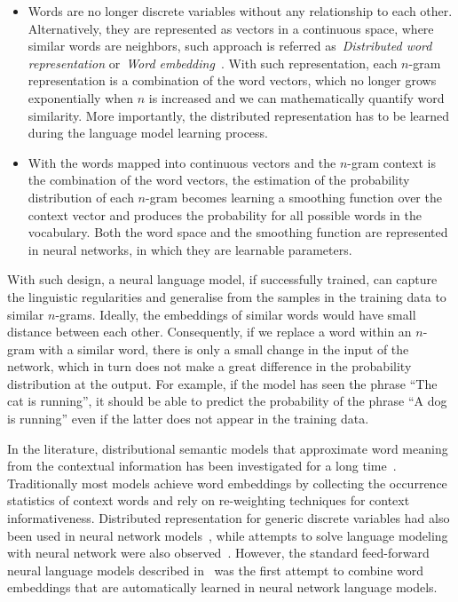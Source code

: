 \begin{itemize}
	\item Words are no longer discrete variables without any relationship to each other. Alternatively, they are represented as vectors in a continuous space, where similar words are neighbors, such approach is referred as~\textit{Distributed word representation} or~\textit{Word embedding}~\cite{bengio2003neural}. With such representation, each $n$-gram representation is a combination of the word vectors, which no longer grows exponentially when $n$ is increased and we can mathematically quantify word similarity. More importantly, the distributed representation has to be learned during the language model learning process. 
	
	\item With the words mapped into continuous vectors and the $n$-gram context is the combination of the word vectors, the estimation of the probability distribution of each $n$-gram becomes learning a smoothing function over the context vector and produces the probability for all possible words in the vocabulary. Both the word space and the smoothing function are represented in neural networks, in which they are learnable parameters. 
\end{itemize}

With such design, a neural language model, if successfully trained, can capture the linguistic regularities and generalise from the samples in the training data to similar $n$-grams. Ideally, the embeddings of similar words would have small distance between each other. Consequently, if we replace a word within an $n$-gram with a similar word, there is only a small change in the input of the network, which in turn does not make a great difference in the probability distribution at the output. For example, if the model has seen the phrase ``The cat is running'', it should be able to predict the probability of the phrase ``A dog is running'' even if the latter does not appear in the training data.

In the literature, distributional semantic models that approximate word meaning from the contextual information has been investigated for a long time~\cite{miller1991contextual}. Traditionally most models achieve word embeddings by collecting the occurrence statistics of context words and rely on re-weighting techniques for context informativeness. Distributed representation for generic discrete variables had also been used in neural network models~\cite{paccanaro2001learning}, while attempts to solve language modeling with neural network were also observed~\cite{schmidhuber1996sequential}. However, the standard feed-forward neural language models described in~\cite{bengio2003neural} was the first attempt to combine word embeddings that are automatically learned in neural network language models. 

